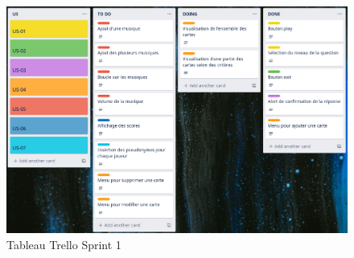 \begin{figure}[ht]
	\centering
	\includegraphics[width=\textwidth]{trello_1.png}
	\caption{Tableau Trello Sprint 1}
	\label{Tableau Trello Sprint 1}
\end{figure}
